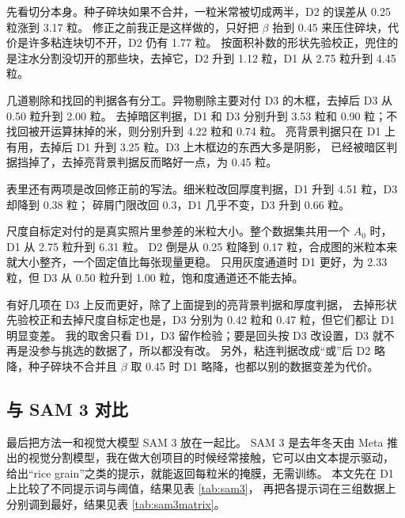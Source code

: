 \begin{ctable}
  \centering
  \caption{去掉或改动某一步后的平均绝对误差，单位为粒，第一行为完整方法。
  每列加粗的是误差最大的一项，即去掉后损失最大的那一步。}
  \label{tab:ablation}
  \tabfit{}
\end{ctable}

先看切分本身。种子碎块如果不合并，一粒米常被切成两半，D2 的误差从 0.25 粒涨到 3.17 粒。
修正之前我正是这样做的，只好把 $\beta$ 抬到 0.45 来压住碎块，代价是许多粘连块切不开，D2 仍有 1.77 粒。
按面积补数的形状先验校正，兜住的是注水分割没切开的那些块，去掉它，D2 升到 1.12 粒，D1 从 2.75 粒升到 4.45 粒。

几道剔除和找回的判据各有分工。异物剔除主要对付 D3 的木框，去掉后 D3 从 0.50 粒升到 2.00 粒。
去掉暗区判据，D1 和 D3 分别升到 3.53 粒和 0.90 粒；不找回被开运算抹掉的米，则分别升到 4.22 粒和 0.74 粒。
亮背景判据只在 D1 上有用，去掉后 D1 升到 3.25 粒。D3 上木框边的东西大多是阴影，
已经被暗区判据挡掉了，去掉亮背景判据反而略好一点，为 0.45 粒。

表里还有两项是改回修正前的写法。细米粒改回厚度判据，D1 升到 4.51 粒，D3 却降到 0.38 粒；
碎屑门限改回 0.3，D1 几乎不变，D3 升到 0.66 粒。

尺度自标定对付的是真实照片里参差的米粒大小。整个数据集共用一个 $A_0$ 时，D1 从 2.75 粒升到 6.31 粒。
D2 倒是从 0.25 粒降到 0.17 粒，合成图的米粒本来就大小整齐，一个固定值比每张现量更稳。
只用灰度通道时 D1 更好，为 2.33 粒，但 D3 从 0.50 粒升到 1.00 粒，饱和度通道还不能去掉。

有好几项在 D3 上反而更好，除了上面提到的亮背景判据和厚度判据，
去掉形状先验校正和去掉尺度自标定也是，D3 分别为 0.42 粒和 0.47 粒，但它们都让 D1 明显变差。
我的取舍只看 D1，D3 留作检验；要是回头按 D3 改设置，D3 就不再是没参与挑选的数据了，所以都没有改。
另外，粘连判据改成“或”后 D2 略降，种子碎块不合并且 $\beta$ 取 0.45 时 D1 略降，也都以别的数据变差为代价。

\subsection{与 SAM 3 对比}
\label{sec:sam3}

最后把方法一和视觉大模型 SAM 3\cite{sam3} 放在一起比。
SAM 3 是去年冬天由 Meta 推出的视觉分割模型，我在做大创项目的时候经常接触，它可以由文本提示驱动，
给出“rice grain”之类的提示，就能返回每粒米的掩膜，无需训练。
本文先在 D1 上比较了不同提示词与阈值，结果见表 \ref{tab:sam3}，
再把各提示词在三组数据上分别调到最好，结果见表 \ref{tab:sam3matrix}。

